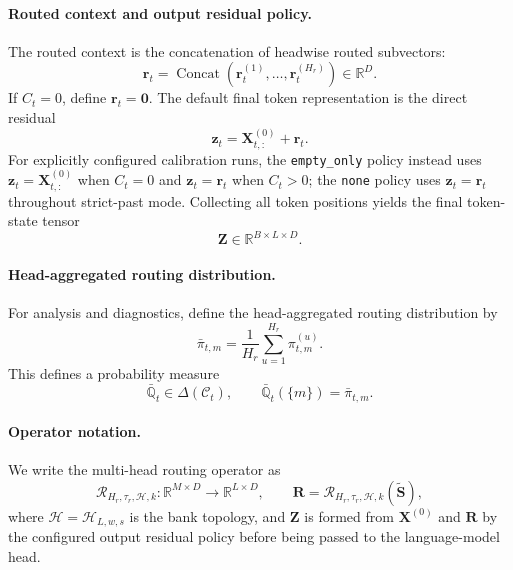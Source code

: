 \documentclass{article}
\theoremstyle{plain}
\theoremstyle{definition}
\theoremstyle{remark}
\begin{document}
\paragraph{Routed context and output residual policy.}
The routed context is the concatenation of headwise routed subvectors:
\begin{equation}
\label{eq:routed-token}
\mathbf r_t
=
\operatorname{Concat}(\mathbf r_t^{(1)},\dots,\mathbf r_t^{(H_r)})
\in\mathbb R^D.
\end{equation}
If $C_t=0$, define $\mathbf r_t=\mathbf 0$. The default final token representation is the direct residual
\begin{equation}
\label{eq:direct-residual-appendix}
\mathbf z_t=\mathbf X^{(0)}_{t,:}+\mathbf r_t.
\end{equation}
For explicitly configured calibration runs, the \texttt{empty\_only} policy
instead uses $\mathbf z_t=\mathbf X^{(0)}_{t,:}$ when $C_t=0$ and
$\mathbf z_t=\mathbf r_t$ when $C_t>0$; the \texttt{none} policy uses
$\mathbf z_t=\mathbf r_t$ throughout strict-past mode.
Collecting all token positions yields the final token-state tensor
\begin{equation}
\label{eq:routed-tokens}
\mathbf Z\in\mathbb R^{B\times L\times D}.
\end{equation}

\paragraph{Head-aggregated routing distribution.}
For analysis and diagnostics, define the head-aggregated routing distribution by
\begin{equation}
\label{eq:aggregated-routing}
\bar\pi_{t,m}=\frac{1}{H_r}\sum_{u=1}^{H_r}\pi_{t,m}^{(u)}.
\end{equation}
This defines a probability measure
\begin{equation}
\label{eq:aggregated-routing-measure}
\bar{\mathbb Q}_t\in\Delta(\mathcal C_t),
\qquad
\bar{\mathbb Q}_t(\{m\})=\bar\pi_{t,m}.
\end{equation}

\paragraph{Operator notation.}
We write the multi-head routing operator as
\begin{equation}
\label{eq:routing-operator}
\mathcal R_{H_r,\tau_r,\mathcal H,k}:\mathbb R^{M\times D}\to\mathbb R^{L\times D},
\qquad
\mathbf R=\mathcal R_{H_r,\tau_r,\mathcal H,k}(\widetilde{\mathbf S}),
\end{equation}
where $\mathcal H=\mathcal H_{L,w,s}$ is the bank topology, and $\mathbf Z$ is formed from $\mathbf X^{(0)}$ and $\mathbf R$ by the configured output residual policy before being passed to the language-model head.
\end{document}
